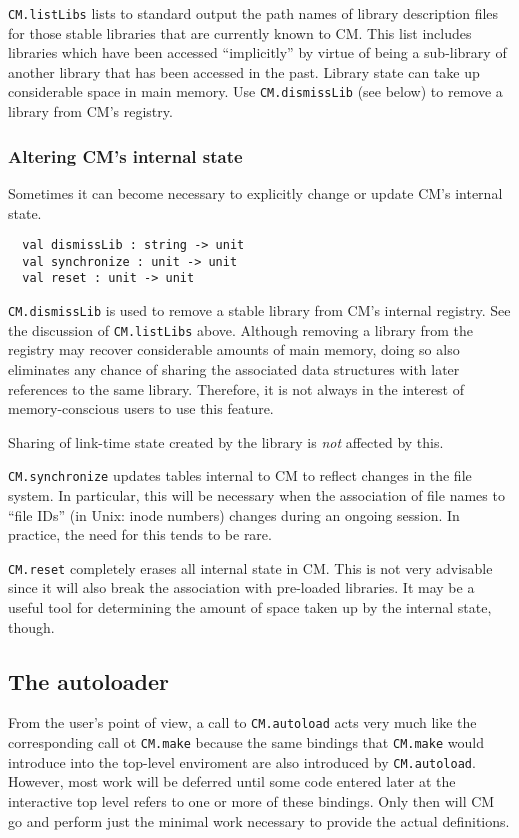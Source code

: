 \documentclass{article}
\begin{document}
{\tt CM.listLibs} lists to standard output the path names of library
description files for those stable libraries that are currently known
to CM.  This list includes libraries which have been accessed
``implicitly'' by virtue of being a sub-library of another library
that has been accessed in the past.  Library state can take up
considerable space in main memory.  Use {\tt CM.dismissLib} (see
below) to remove a library from CM's registry.

\subsubsection*{Altering CM's internal state}

Sometimes it can become necessary to explicitly change or update CM's
internal state.

\begin{verbatim}
  val dismissLib : string -> unit
  val synchronize : unit -> unit
  val reset : unit -> unit
\end{verbatim}

{\tt CM.dismissLib} is used to remove a stable library from CM's
internal registry.  See the discussion of {\tt CM.listLibs} above.
Although removing a library from the registry may recover considerable
amounts of main memory, doing so also eliminates any chance of sharing
the associated data structures with later references to the same
library.  Therefore, it is not always in the interest of
memory-conscious users to use this feature.

Sharing of link-time state created by the library is {\em not}
affected by this.

{\tt CM.synchronize} updates tables internal to CM to reflect changes
in the file system.  In particular, this will be necessary when the
association of file names to ``file IDs'' (in Unix: inode numbers)
changes during an ongoing session.  In practice, the need for this
tends to be rare.

{\tt CM.reset} completely erases all internal state in CM.  This is
not very advisable since it will also break the association with
pre-loaded libraries.  It may be a useful tool for determining the
amount of space taken up by the internal state, though.

\subsection{The autoloader}
\label{sec:autoload}

From the user's point of view, a call to {\tt CM.autoload} acts very
much like the corresponding call ot {\tt CM.make} because the same
bindings that {\tt CM.make} would introduce into the top-level
enviroment are also introduced by {\tt CM.autoload}.  However, most
work will be deferred until some code entered later at the interactive
top level refers to one or more of these bindings.  Only then will CM
go and perform just the minimal work necessary to provide the actual
definitions.
\end{document}
